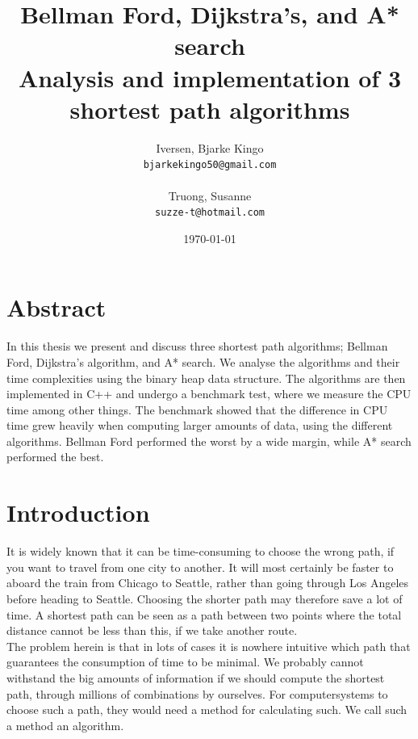 \documentclass[11pt]{article}
\title{
  \vspace{3cm}
  \Huge{Bellman Ford, Dijkstra's, and A* search} \\
  \Large{Analysis and implementation of 3 shortest path algorithms}
}
\author{
  \Large{Iversen, Bjarke Kingo}
  \\ \texttt{bjarkekingo50@gmail.com} \\\\
  \Large{Truong, Susanne}
  \\ \texttt{suzze-t@hotmail.com}
}
\date{
    \today
}
\def \ColourPDF {include/ku-farve}
\def \TitlePDF   {include/nat-en}  %
\begin{document}


\clearpage\maketitle
\thispagestyle{empty}

\newpage

\section{Abstract}
In this thesis we present and discuss three shortest path algorithms; Bellman Ford, Dijkstra's algorithm, and A* search. We analyse the algorithms and their time complexities using the binary heap data structure. The algorithms are then implemented in C++ and undergo a benchmark test, where we measure the CPU time among other things. The benchmark showed that the difference in CPU time grew heavily when computing larger amounts of data, using the different algorithms. Bellman Ford performed the worst by a wide margin, while A* search performed the best.


\newpage
\tableofcontents
\newpage
\section{Introduction}
It is widely known that it can be time-consuming to choose the wrong path, if you want to travel from one city to another. It will most certainly be faster to aboard the train from Chicago to Seattle, rather than going through Los Angeles before heading to Seattle. Choosing the shorter path may therefore save a lot of time. A shortest path can be seen as a path between two points where the total distance cannot be less than this, if we take another route. \\

\noindent The problem herein is that in lots of cases it is nowhere intuitive which path that guarantees the consumption of time to be minimal. We probably cannot withstand the big amounts of information if we should compute the shortest path, through millions of combinations by ourselves. For computersystems to choose such a path, they would need a method for calculating such. We call such a method an algorithm.\\
\end{document}
